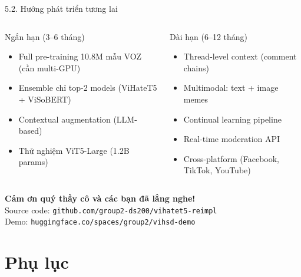 \documentclass[11pt, aspectratio=169]{beamer}
\begin{document}
\begin{frame}{5.2. Hướng phát triển tương lai}

\begin{columns}[T]
  \begin{block}{Ngắn hạn (3--6 tháng)}
    \begin{itemize}
      \item Full pre-training 10.8M mẫu VOZ (cần multi-GPU)
      \item Ensemble chỉ top-2 models (ViHateT5 + ViSoBERT)
      \item Contextual augmentation (LLM-based)
      \item Thử nghiệm ViT5-Large (1.2B params)
    \end{itemize}
  \end{block}

  \begin{block}{Dài hạn (6--12 tháng)}
    \begin{itemize}
      \item Thread-level context (comment chains)
      \item Multimodal: text + image memes
      \item Continual learning pipeline
      \item Real-time moderation API
      \item Cross-platform (Facebook, TikTok, YouTube)
    \end{itemize}
  \end{block}
\end{columns}

\vspace{0.3cm}
\begin{center}
  \Large\textbf{Cảm ơn quý thầy cô và các bạn đã lắng nghe!}\\[0.3cm]
  \normalsize
  Source code: \texttt{github.com/group2-ds200/vihatet5-reimpl}\\
  Demo: \texttt{huggingface.co/spaces/group2/vihsd-demo}
\end{center}
\end{frame}

\section{Phụ lục}
\end{document}
